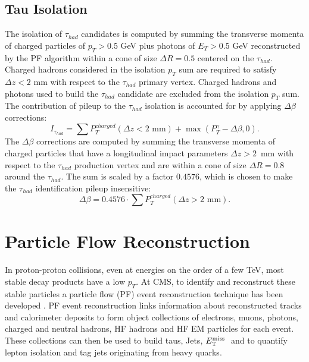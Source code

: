\subsection{Tau Isolation}
The isolation of $\tau_{had}$ candidates is computed
by summing the transverse momenta of charged particles 
of $p_{T} > 0.5$ GeV plus photons of $E_{T} > 0.5$ GeV 
reconstructed by the PF algorithm
within a cone of size $\Delta R = 0.5$ centered on the $\tau_{had}$.
Charged hadrons considered in the isolation $p_{T}$ sum 
are required to satisfy $\Delta z < 2$ mm with respect to the 
$\tau_{had}$ primary vertex.
Charged hadrons and photons used to build the $\tau_{had}$ candidate 
are excluded from the isolation $p_{T}$ sum.
The contribution of pileup to the $\tau_{had}$ isolation 
is accounted for by applying $\Delta \beta$ corrections:
\begin{equation*}
I_{\tau_{had}} = \sum P_{T}^{charged} (\Delta z < 2\mbox{~mm}) + \max \left( P_{T}^{\gamma} - \Delta \beta, 0 \right).
\end{equation*}
The $\Delta \beta$ corrections are computed by summing the transverse
momenta of charged particles that have a longitudinal impact 
parameters $\Delta z > 2$~mm with respect to the 
$\tau_{had}$ production vertex
and are within a cone of size $\Delta R = 0.8$ around the $\tau_{had}$.
The sum is scaled by a factor $0.4576$, which is chosen to 
make the $\tau_{had}$ identification pileup insensitive:
\begin{equation*}
\Delta \beta = 0.4576 \cdot \sum P_{T}^{charged} (\Delta z > 2\mbox{~mm}).
\end{equation*}

\section{Particle Flow Reconstruction}
In proton-proton collisions, even at energies on the order of a few TeV, 
most stable decay products have a low $p_{T}$.
At CMS, to identify and reconstruct these stable particles a particle flow (PF) event 
reconstruction technique has been developed \cite{PFT09001}\cite{PFT10003}. 
PF event reconstruction links 
information %
about reconstructed tracks and calorimeter deposits
to form object collections of 
electrons, muons, photons, charged and neutral hadrons, HF hadrons and HF EM particles
for each event. These collections can then be used to build taus, Jets, $E_\mathrm{T}^{\mathrm{miss}}\;$
and to quantify lepton isolation and tag jets originating from heavy quarks.

